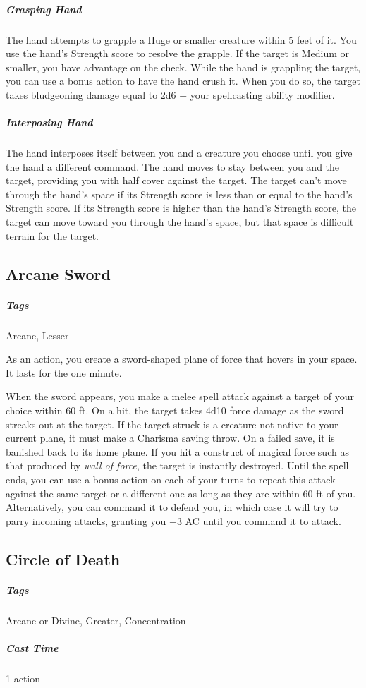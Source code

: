 \subparagraph*{Grasping Hand} The hand attempts to grapple a Huge or smaller creature within 5 feet of it. You use the hand's Strength score to resolve the grapple. If the target is Medium or smaller, you have advantage on the check. While the hand is grappling the target, you can use a bonus action to have the hand crush it. When you do so, the target takes bludgeoning damage equal to 2d6 + your spellcasting ability modifier.

\subparagraph*{Interposing Hand} The hand interposes itself between you and a creature you choose until you give the hand a different command. The hand moves to stay between you and the target, providing you with half cover against the target. The target can't move through the hand's space if its Strength score is less than or equal to the hand's Strength score. If its Strength score is higher than the hand's Strength score, the target can move toward you through the hand's space, but that space is difficult terrain for the target.

\subsection{Arcane Sword}\label{spell:arcane-sword}

\subparagraph*{Tags} Arcane, Lesser

As an action, you create a sword-shaped plane of force that hovers in your space. It lasts for the one minute.

When the sword appears, you make a melee spell attack against a target of your choice within 60 ft. On a hit, the target takes 4d10 force damage as the sword streaks out at the target. If the target struck is a creature not native to your current plane, it must make a Charisma saving throw. On a failed save, it is banished back to its home plane. If you hit a construct of magical force such as that produced by \textit{wall of force}, the target is instantly destroyed. Until the spell ends, you can use a bonus action on each of your turns to repeat this attack against the same target or a different one as long as they are within 60 ft of you. Alternatively, you can command it to defend you, in which case it will try to parry incoming attacks, granting you +3 AC until you command it to attack.

\subsection{Circle of Death}\label{spell:circle-of-death}
\subparagraph*{Tags} Arcane or Divine, Greater, Concentration
\subparagraph*{Cast Time} 1 action

